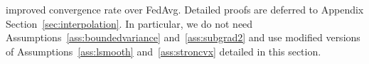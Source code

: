 improved convergence rate over FedAvg. Detailed proofs are deferred to Appendix Section~\ref{sec:interpolation}. In particular, we do not need Assumptions~\ref{ass:boundedvariance} and~\ref{ass:subgrad2} and use modified versions of Assumptions~\ref{ass:lsmooth} and~\ref{ass:stroncvx} detailed in this section.
\begin{comment}
we deal with the question of whether FedAvg with momentum-based
local updates can outperform FedAvg with SGD updates. In contrast
to the gradient descent setting, Nesterov and Heavy Ball updates are
known to fail to accelerate over SGD, both in the overparameterized
setting and standard convex setting \cite{liu2018accelerating,kidambi2018insufficiency,liu2018toward,yuan2016influence}.
Thus in general one cannot hope to obtain acceleration results for
the FedAvg algorithm with Nesterov and Heavy Ball updates. On the
hopeful side, \cite{jain2017accelerating,liu2018accelerating} introduced
similar algorithms that make modifications of the Nesterov updates
to correct for its ``over-descent''. For quadratic objectives in
the overparamterized setting, \cite{liu2018accelerating} show their
algorithm achieves acceleration over the geometric convergence of
SGD that recovers the well-known $\mathcal{O}(\exp(-t/\sqrt{\kappa})$
acceleration of Nesterov over GD. In the last part, we introduce a
new accelerated FedAvg algorithm by adapting the MaSS algorithm of
\cite{liu2018accelerating} to the federated learning setting. We
show that it achieves geometric convergence for overparameterized
quadratic problems with rate $\mathcal{O}(\exp(-\frac{NT}{E\sqrt{\kappa_{1}\tilde{\kappa}}}))$,
where $\tilde{\kappa}$ is a ``statistical condition number''\cite{liu2018accelerating,jain2017accelerating}
that satisfies $\tilde{\kappa}\leq\kappa_{1}$. Thus our new FedAvg
algorithm achieves a speedup of factor $\sqrt{\kappa_{1}/\tilde{\kappa}}$
over FedAvg with local SGD updates. 
\end{comment}


